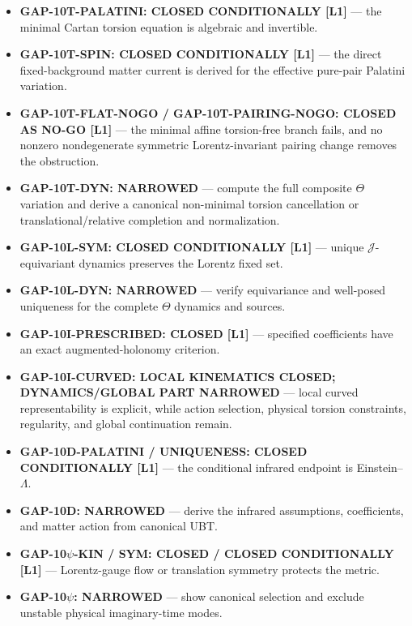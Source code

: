 \documentclass[12pt]{article}
\begin{document}
\begin{tcolorbox}[colback=yellow!7!white,colframe=orange!70!black,
 title=Closed conditional subgaps and remaining dynamical work]
\begin{itemize}
 \item \textbf{GAP-10T-PALATINI: CLOSED CONDITIONALLY [L1]} --- the minimal
       Cartan torsion equation is algebraic and invertible.
 \item \textbf{GAP-10T-SPIN: CLOSED CONDITIONALLY [L1]} --- the direct
       fixed-background matter current is derived for the effective pure-pair
       Palatini variation.
 \item \textbf{GAP-10T-FLAT-NOGO / GAP-10T-PAIRING-NOGO: CLOSED AS NO-GO [L1]}
       --- the minimal affine torsion-free branch fails, and no nonzero
       nondegenerate symmetric Lorentz-invariant pairing change removes the
       obstruction.
 \item \textbf{GAP-10T-DYN: NARROWED} --- compute the full composite
       $\Theta$ variation and derive a canonical non-minimal torsion
       cancellation or translational/relative completion and normalization.
 \item \textbf{GAP-10L-SYM: CLOSED CONDITIONALLY [L1]} --- unique
       $\mathcal J$-equivariant dynamics preserves the Lorentz fixed set.
 \item \textbf{GAP-10L-DYN: NARROWED} --- verify equivariance and well-posed
       uniqueness for the complete $\Theta$ dynamics and sources.
 \item \textbf{GAP-10I-PRESCRIBED: CLOSED [L1]} --- specified coefficients
       have an exact augmented-holonomy criterion.
 \item \textbf{GAP-10I-CURVED: LOCAL KINEMATICS CLOSED; DYNAMICS/GLOBAL
       PART NARROWED} --- local curved representability is explicit, while
       action selection, physical torsion constraints, regularity, and global
       continuation remain.
 \item \textbf{GAP-10D-PALATINI / UNIQUENESS: CLOSED CONDITIONALLY [L1]} ---
       the conditional infrared endpoint is Einstein--$\Lambda$.
 \item \textbf{GAP-10D: NARROWED} --- derive the infrared assumptions,
       coefficients, and matter action from canonical UBT.
 \item \textbf{GAP-10$\psi$-KIN / SYM: CLOSED / CLOSED CONDITIONALLY [L1]} ---
       Lorentz-gauge flow or translation symmetry protects the metric.
 \item \textbf{GAP-10$\psi$: NARROWED} --- show canonical selection and
       exclude unstable physical imaginary-time modes.
\end{itemize}
\end{tcolorbox}
\end{document}
